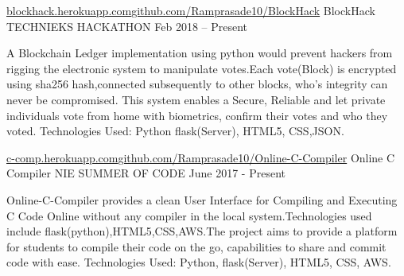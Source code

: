 

\begin{cventries}

  \cventry
    {\href{https://blockhack.herokuapp.com}{blockhack.herokuapp.com}\quad\textbar\quad \href{https://github.com/Ramprasade10/BlockHack}{github.com/Ramprasade10/BlockHack}} %
    {BlockHack} %
    {TECHNIEKS HACKATHON} %
    {Feb 2018 – Present} %
    {
      \begin{cvitems} %
        \item {A Blockchain Ledger implementation using python would prevent hackers from rigging the electronic system to manipulate votes.Each vote(Block) is encrypted using sha256 hash,connected subsequently to other blocks, who’s integrity can never be compromised. This system enables a Secure, Reliable and let private individuals vote from home with biometrics, confirm their votes and who they voted.\newline{}
Technologies Used: Python flask(Server), HTML5, CSS,JSON.}
      \end{cvitems}
    }

  \cventry
    {\href{https://c-comp.herokuapp.com}{c-comp.herokuapp.com}\quad\textbar\quad \href{https://github.com/Ramprasade10/Online-C-Compiler}{github.com/Ramprasade10/Online-C-Compiler}}
    {Online C Compiler} %
    {NIE SUMMER OF CODE} %
    {June 2017 - Present} %
    {
      \begin{cvitems} %
        \item {Online-C-Compiler provides a clean User Interface for Compiling and Executing C Code Online without any compiler in the local system.Technologies used include flask(python),HTML5,CSS,AWS.The project aims to provide a platform for students to compile their code on the go, capabilities to share and commit code with ease.\newline{}
Technologies Used: Python, flask(Server), HTML5, CSS, AWS.}
      \end{cvitems}
    }


\end{cventries}
